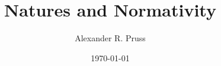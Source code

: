 \def\book{}



\title{Natures and Normativity}
\author{Alexander R. Pruss}
\date{\today}


\maketitle

\setcounter{secnumdepth}{4}
\setcounter{tocdepth}{4}
\tableofcontents





\printbibliography

